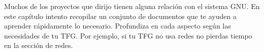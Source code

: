 Muchos de los proyectos que dirijo tienen alguna relación con el sistema GNU.  En este capítulo intento recopilar un conjunto de documentos que te ayuden a aprender rápidamente lo necesario.  Profundiza en cada aspecto según las necesidades de tu TFG.  Por ejemplo, si tu TFG no usa redes no pierdas tiempo en la sección de redes.





